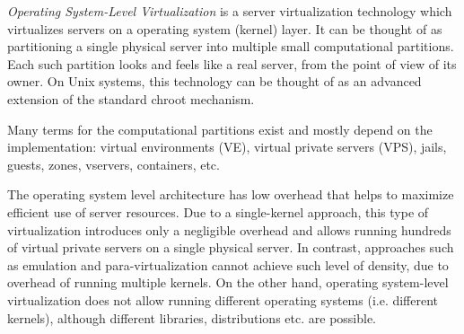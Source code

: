 \textit{Operating System-Level Virtualization} is a server virtualization
technology which virtualizes servers on a operating system (kernel) layer. It
can be thought of as partitioning a single physical server into multiple small
computational partitions. Each such partition looks and feels like a real
server, from the point of view of its owner. On Unix systems, this technology
can be thought of as an advanced extension of the standard chroot mechanism.

Many terms for the computational partitions exist and mostly depend on the
implementation: virtual environments (VE), virtual private servers (VPS),
jails, guests, zones, vservers, containers, etc.

The operating system level architecture has low overhead that helps to maximize
efficient use of server resources. Due to a single-kernel approach, this type
of virtualization introduces only a negligible overhead and allows running
hundreds of virtual private servers on a single physical server. In contrast,
approaches such as emulation and para-virtualization cannot achieve such level
of density, due to overhead of running multiple kernels. On the other hand,
operating system-level virtualization does not allow running different
operating systems (i.e. different kernels), although different libraries,
distributions etc. are possible.~\cite{wp-os-virt}
